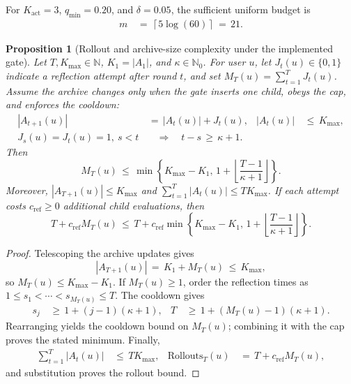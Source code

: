 \documentclass{article} %
\newtheorem{proposition}[theorem]{Proposition}
\begin{document}
For \(K_{\mathrm{act}}=3\), \(q_{\min}=0.20\), and \(\delta=0.05\), the
sufficient uniform budget is
\begin{equation}
\begin{aligned}
m
&\,=\,
\left\lceil
5\log(60)
\right\rceil
\,=\,21.
\end{aligned}
\end{equation}

\begin{proposition}[Rollout and archive-size complexity under the implemented gate]
\label{prop:3}
Let \(T,K_{\max}\in\mathbb N\), \(K_1=|A_1|\), and
\(\kappa\in\mathbb N_0\).  For user \(u\), let \(J_t(u)\in\{0,1\}\) indicate a
reflection attempt after round \(t\), and set
\(M_T(u)=\sum_{t=1}^T J_t(u)\).  Assume the archive changes only when the gate
inserts one child, obeys the cap, and enforces the cooldown:
\begin{equation}
\begin{aligned}
|A_{t+1}(u)|
&\,=\,|A_t(u)|+J_t(u), &
|A_t(u)|
&\,\leq\,K_{\max}, \\
J_s(u)=J_t(u)=1,\ s<t
&\quad\Longrightarrow\quad
t-s\,\geq\,\kappa+1.
\end{aligned}
\end{equation}
Then
\begin{equation}
M_T(u)
\,\leq\,
\min\!\left\{
K_{\max}-K_1,\,
1+\left\lfloor\frac{T-1}{\kappa+1}\right\rfloor
\right\}.
\end{equation}
Moreover, \(|A_{T+1}(u)|\leq K_{\max}\) and
\(\sum_{t=1}^T|A_t(u)|\leq TK_{\max}\).  If each attempt costs
\(c_{\mathrm{ref}}\geq0\) additional child evaluations, then
\begin{equation}
T+c_{\mathrm{ref}}M_T(u)
\,\leq\,
T
+
c_{\mathrm{ref}}
\min\!\left\{
K_{\max}-K_1,\,
1+\left\lfloor\frac{T-1}{\kappa+1}\right\rfloor
\right\}.
\end{equation}
\end{proposition}

\begin{proof}
Telescoping the archive updates gives
\begin{equation}
|A_{T+1}(u)|
\,=\,
K_1+M_T(u)
\,\leq\,K_{\max},
\end{equation}
so \(M_T(u)\leq K_{\max}-K_1\).  If \(M_T(u)\geq1\), order the reflection
times as \(1\leq s_1<\cdots<s_{M_T(u)}\leq T\).  The cooldown gives
\begin{equation}
\begin{aligned}
s_j
&\,\geq\,1+(j-1)(\kappa+1), &
T
&\,\geq\,1+(M_T(u)-1)(\kappa+1).
\end{aligned}
\end{equation}
Rearranging yields the cooldown bound on \(M_T(u)\); combining it with the cap
proves the stated minimum.  Finally,
\begin{equation}
\begin{aligned}
\sum_{t=1}^{T}|A_t(u)|
&\,\leq\,T K_{\max}, &
\mathrm{Rollouts}_T(u)
&\,=\,T+c_{\mathrm{ref}}M_T(u),
\end{aligned}
\end{equation}
and substitution proves the rollout bound.
\end{proof}
\end{document}
